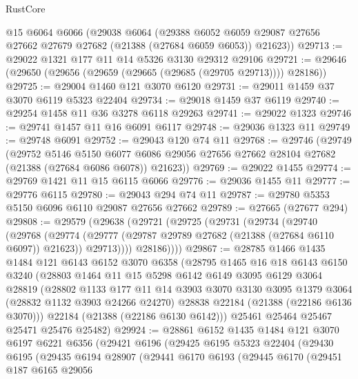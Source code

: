 \begin{lexlean}{RustCore}
\begin{coremodule}
    @15
    @6064
    @6066
    (@29038
      @6064
      (@29388 @6052 @6059 @29087 @27656 @27662 @27679 @27682 (@21388 (@27684 @6059 @6053)) @21623))
@29713 := @29022 @1321 @177 @11 @14 @5326 @3130 @29312 @29106
@29721 := @29646 (@29650 (@29656 (@29659 (@29665 (@29685 (@29705 @29713)))) @28186))
@29725 := @29004 @1460 @121 @3070 @6120
@29731 := @29011 @1459 @37 @3070 @6119 @5323 @22404
@29734 := @29018 @1459 @37 @6119
@29740 := @29254 @1458 @11 @36 @3278 @6118 @29263
@29741 := @29022 @1323
@29746 := @29741 @1457 @11 @16 @6091 @6117
@29748 := @29036 @1323 @11
@29749 := @29748 @6091
@29752 := @29043 @120 @74 @11
@29768 := @29746
    (@29749
      (@29752
        @5146
        @5150
        @6077
        @6086
        @29056
        @27656
        @27662
        @28104
        @27682
        (@21388 (@27684 @6086 @6078))
        @21623))
@29769 := @29022 @1455
@29774 := @29769 @1421 @11 @15 @6115 @6066
@29776 := @29036 @1455 @11
@29777 := @29776 @6115
@29780 := @29043 @294 @74 @11
@29787 := @29780 @5353 @5150 @6096 @6110 @29087 @27656 @27662
@29789 := @27665 (@27677 @294)
@29808 := @29579
    (@29638
      (@29721
        (@29725
          (@29731
            (@29734
              (@29740
                (@29768
                  (@29774
                    (@29777 (@29787 @29789 @27682 (@21388 (@27684 @6110 @6097)) @21623))
                    @29713))))
            @28186))))
@29867 := @28785
    @1466
    @1435
    @1484
    @121
    @6143
    @6152
    @3070
    @6358
    (@28795
      @1465
      @16
      @18
      @6143
      @6150
      @3240
      (@28803
        @1464
        @11
        @15
        @5298
        @6142
        @6149
        @3095
        @6129
        @3064
        @28819
        (@28802
          @1133
          @177
          @11
          @14
          @3903
          @3070
          @3130
          @3095
          @1379
          @3064
          (@28832 @1132 @3903 @24266 @24270)
          @28838
          @22184
          (@21388 (@22186 @6136 @3070)))
        @22184
        (@21388 (@22186 @6130 @6142)))
      @25461
      @25464
      @25467
      @25471
      @25476
      @25482)
@29924 := @28861
    @6152
    @1435
    @1484
    @121
    @3070
    @6197
    @6221
    @6356
    (@29421
      @6196
      (@29425
        @6195
        @5323
        @22404
        (@29430
          @6195
          (@29435
            @6194
            @28907
            (@29441
              @6170
              @6193
              (@29445
                @6170
                (@29451
                  @187
                  @6165
                  @29056

\end{coremodule}
\end{lexlean}
